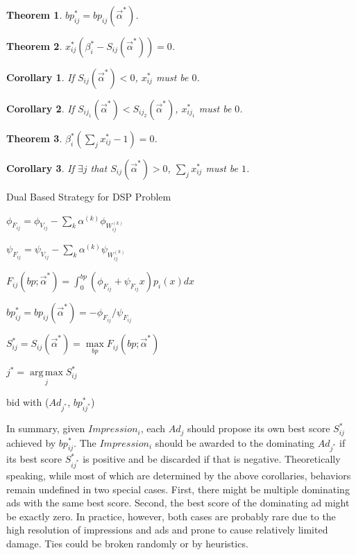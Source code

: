 \documentclass{article}
\DeclareMathOperator*{\argmax}{arg\,max}
\newtheorem{theorem}{Theorem}[section]
\newtheorem{corollary}{Corollary}[theorem]
\newcommand{\sx}{x_{ij}}
\newcommand{\sbp}{bp_{ij}}
\newcommand{\sV}{V_{ij}}
\newcommand{\sW}{W_{ij}^{(k)}}
\newcommand{\salpha}{\alpha^{(k)}}
\newcommand{\sbeta}{\beta_i}
\newcommand{\sF}{F_{ij}}
\newcommand{\sS}{S_{ij}}
\newcommand{\valpha}{\vec{\alpha}}
\newcommand{\pprob}{\phi}
\newcommand{\pcost}{\psi}
\begin{document}
\begin{theorem}
$\sbp^* = \sbp(\valpha^*)$.
\end{theorem}

\begin{theorem}
$\sx^*(\sbeta^* - \sS(\valpha^*)) = 0$.
\end{theorem}

\begin{corollary}
If $\sS(\valpha^*) < 0$, $\sx^*$ must be $0$.
\end{corollary}

\begin{corollary}
If $S_{ij_1}(\valpha^*) < S_{ij_2}(\valpha^*)$, $x_{ij_1}^*$ must be $0$.
\end{corollary}

\begin{theorem}
$\sbeta^*(\sum\limits_j \sx^* - 1) = 0$.
\end{theorem}

\begin{corollary}
If $\exists j$ that $\sS(\valpha^*) > 0$, $\sum\limits_j \sx^*$ must be $1$.
\end{corollary}

\begin{algorithm}
\caption{Dual Based Strategy for DSP Problem \label{DSPAlgo}}

{
  {
    $\pprob_{\sF} = \pprob_{\sV} - \sum\limits_k \salpha \pprob_{\sW}$

    $\pcost_{\sF} = \pcost_{\sV} - \sum\limits_k \salpha \pcost_{\sW}$

    $\sF(bp; \valpha^*) = \int_0^{bp} (\pprob_{\sF}+\pcost_{\sF}x)p_i(x)dx$

    $\sbp^* = \sbp(\valpha^*) = -\pprob_{\sF} / \pcost_{\sF}$

    $\sS^* = \sS(\valpha^*) = \max\limits_{bp} \sF(bp; \valpha^*)$
  }
  $j^* = \argmax\limits_j \sS^*$
  
   { bid with ($Ad_{j^*}$, $bp_{ij^*}^*$) }
}
\end{algorithm}

In summary, given $Impression_i$, each $Ad_j$ should propose its own best score $\sS^*$ achieved by $\sbp^*$.
The $Impression_i$ should be awarded to the dominating $Ad_{j^*}$ if its best score $S_{ij^*}^*$ is positive
    and be discarded if that is negative.
Theoretically speaking, while most of which are determined by the above corollaries,
    behaviors remain undefined in two special cases.
First, there might be multiple dominating ads with the same best score.
Second, the best score of the dominating ad might be exactly zero.
In practice, however, both cases are probably rare due to the high resolution of impressions and ads and prone to cause relatively limited damage.
Ties could be broken randomly or by heuristics.
\end{document}
